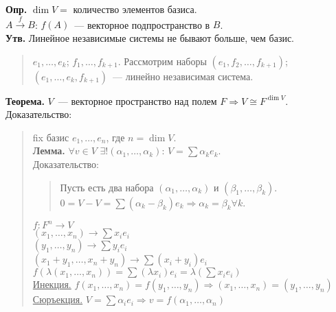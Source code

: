 \documentclass{article}
\begin{document}
	\textbf{Опр.} $\dim V = $ количество элементов базиса. \\
	$A \xrightarrow{f} B$: $f(A)$~--- векторное подпространство в $B$. \\
	\textbf{Утв.} Линейное независимые системы не бывают больше, чем базис. \\
	\begin{quote}
		$e_1, \dots, e_k$; $f_1, \dots, f_{k + 1}$. Рассмотрим наборы $(e_1, f_2, \dots, f_{k + 1})$; $(e_1, \dots, e_k, f_{k + 1})$~--- линейно независимая система.
	\end{quote}
	\textbf{Теорема.} $V$~--- векторное пространство над полем $F \Rightarrow V \cong F^{\dim V}$. \\
	Доказательство:
	\begin{quote}
		fix базис $e_1, \dots, e_n$, где $n = \dim V$. \\
		\textbf{Лемма.} $\forall v \in V$ $\exists! (\alpha_1, \dots, \alpha_k)$: $V = \sum \alpha_k e_k$. \\
		Доказательство:
		\begin{quote}
			Пусть есть два набора $(\alpha_1, \dots, \alpha_k)$ и $(\beta_1, \dots, \beta_k)$. $0 = V - V = \sum (\alpha_k - \beta_k)e_k \Rightarrow \alpha_k = \beta_k \forall k$.
		\end{quote}
		$f: F^n \rightarrow V$ \\
		$(x_1, \dots, x_n) \rightarrow \sum x_i e_i$ \\
		$(y_1, \dots, y_n) \rightarrow \sum y_i e_i$ \\
		$(x_1 + y_1, \dots, x_n + y_n) \rightarrow \sum (x_i + y_i) e_i$ \\
		$f(\lambda (x_1, \dots, x_n)) = \sum (\lambda x_i) e_i = \lambda (\sum x_i e_i)$ \\
		\underline{Инекция.} $f(x_1, \dots, x_n) = f(y_1, \dots, y_n) \Rightarrow (x_1, \dots, x_n) = (y_1, \dots, y_n)$ \\
		\underline{Сюръекция.} $V = \sum \alpha_i e_i \Rightarrow v = f(\alpha_1, \dots, \alpha_n)$
	\end{quote}
\end{document}
